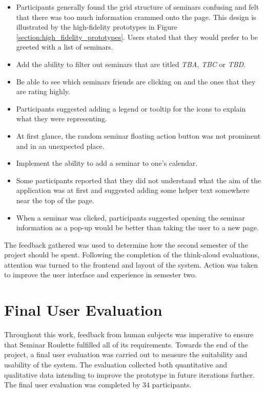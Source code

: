 \documentclass{l4proj}
\begin{document}
\begin{itemize}
    \item Participants generally found the grid structure of seminars confusing and felt that there was too much information crammed onto the page. This design is illustrated by the high-fidelity prototypes in Figure \ref{section:high_fidelity_prototypes}. Users stated that they would prefer to be greeted with a list of seminars.
    \item Add the ability to filter out seminars that are titled \emph{TBA}, \emph{TBC} or \emph{TBD}.
    \item Be able to see which seminars friends are clicking on and the ones that they are rating highly.
    \item Participants suggested adding a legend or tooltip for the icons to explain what they were representing.
    \item At first glance, the random seminar floating action button was not prominent and in an unexpected place.
    \item Implement the ability to add a seminar to one's calendar.
    \item Some participants reported that they did not understand what the aim of the application was at first and suggested adding some helper text somewhere near the top of the page.
    \item When a seminar was clicked, participants suggested opening the seminar information as a pop-up would be better than taking the user to a new page.
\end{itemize}

The feedback gathered was used to determine how the second semester of the project should be spent. Following the completion of the think-aloud evaluations, attention was turned to the frontend and layout of the system. Action was taken to improve the user interface and experience in semester two.

\section{Final User Evaluation}
\label{section:user_evaluation}

Throughout this work, feedback from human subjects was imperative to ensure that Seminar Roulette fulfilled all of its requirements. Towards the end of the project, a final user evaluation was carried out to measure the suitability and usability of the system. The evaluation collected both quantitative and qualitative data intending to improve the prototype in future iterations further. The final user evaluation was completed by 34 participants.
\end{document}
